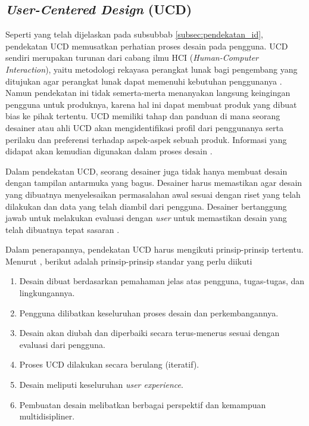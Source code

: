 \subsection{\textit{User-Centered Design} (UCD)}
Seperti yang telah dijelaskan pada subsubbab \ref{subsec:pendekatan_id}, pendekatan UCD memusatkan perhatian proses desain pada pengguna. UCD sendiri merupakan turunan dari cabang ilmu HCI (\textit{Human-Computer Interaction}), yaitu metodologi rekayasa perangkat lunak bagi pengembang yang ditujukan agar perangkat lunak dapat memenuhi kebutuhan penggunanya \parencite{lowdermilk2013user}. Namun pendekatan ini tidak semerta-merta menanyakan langsung keingingan pengguna untuk produknya, karena hal ini dapat membuat produk yang dibuat bias ke pihak tertentu. UCD memiliki tahap dan panduan di mana seorang desainer atau ahli UCD akan mengidentifikasi profil dari penggunanya serta perilaku dan preferensi terhadap aspek-aspek sebuah produk. Informasi yang didapat akan kemudian digunakan dalam proses desain \parencite{10.1145/1621995.1621997}.

Dalam pendekatan UCD, seorang desainer juga tidak hanya membuat desain dengan tampilan antarmuka yang bagus. Desainer harus memastikan agar desain yang dibuatnya menyelesaikan permasalahan awal sesuai dengan riset yang telah dilakukan dan data yang telah diambil dari pengguna. Desainer bertanggung jawab untuk melakukan evaluasi dengan \textit{user} untuk memastikan desain yang telah dibuatnya tepat sasaran \parencite{lowdermilk2013user}.

Dalam penerapannya, pendekatan UCD harus mengikuti prinsip-prinsip tertentu. Menurut \textcite{iso9241-210:2010}, berikut adalah prinsip-prinsip standar yang perlu diikuti

\begin{enumerate}
  \item Desain dibuat berdasarkan pemahaman jelas atas pengguna, tugas-tugas, dan lingkungannya.
  \item Pengguna dilibatkan keseluruhan proses desain dan perkembangannya.
  \item Desain akan diubah dan diperbaiki secara terus-menerus sesuai dengan evaluasi dari pengguna.
  \item Proses UCD dilakukan secara berulang (iteratif).
  \item Desain meliputi keseluruhan \textit{user experience}.
  \item Pembuatan desain melibatkan berbagai perspektif dan kemampuan multidisipliner.
\end{enumerate}

